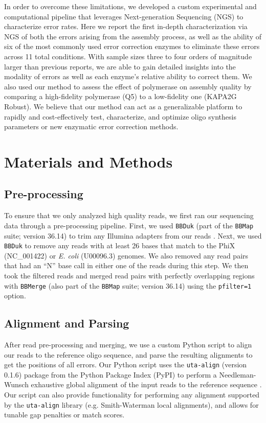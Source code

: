 \documentclass[twocolumn]{article}
\begin{document}
In order to overcome these limitations, we developed a custom experimental and computational pipeline that leverages Next-generation Sequencing (NGS) to characterize error rates. Here we report the first in-depth characterization via NGS of both the errors arising from the assembly process, as well as the ability of six of the most commonly used error correction enzymes to eliminate these errors across 11 total conditions. With sample sizes three to four orders of magnitude larger than previous reports, we are able to gain detailed insights into the modality of errors as well as each enzyme's relative ability to correct them. We also used our method to assess the effect of polymerase on assembly quality by comparing a high-fidelity polymerase (Q5) to a low-fidelity one (KAPA2G Robust). We believe that our method can act as a generalizable platform to rapidly and cost-effectively test, characterize, and optimize oligo synthesis parameters or new enzymatic error correction methods.

%
\section*{Materials and Methods}
%

\subsection*{Pre-processing}
To ensure that we only analyzed high quality reads, we first ran our sequencing data through a pre-processing pipeline. First, we used \texttt{BBDuk} (part of the \texttt{BBMap} suite; version 36.14) to trim any Illumina adapters from our reads \cite{bbmap}. Next, we used \texttt{BBDuk} to remove any reads with at least 26 bases that match to the PhiX (NC\_001422) or \textit{E. coli} (U00096.3) genomes. We also removed any read pairs that had an ``N'' base call in either one of the reads during this step. We then took the filtered reads and merged read pairs with perfectly overlapping regions with \texttt{BBMerge} (also part of the \texttt{BBMap} suite; version 36.14) using the \texttt{pfilter=1} option.

\subsection*{Alignment and Parsing}
After read pre-processing and merging, we use a custom Python script to align our reads to the reference oligo sequence, and parse the resulting alignments to get the positions of all errors. Our Python script uses the \texttt{uta-align} (version 0.1.6) package from the Python Package Index (PyPI) to perform a Needleman-Wunsch exhaustive global alignment of the input reads to the reference sequence \cite{uta-align}. Our script can also provide functionality for performing any alignment supported by the \texttt{uta-align} library (e.g. Smith-Waterman local alignments), and allows for tunable gap penalties or match scores.
\end{document}
